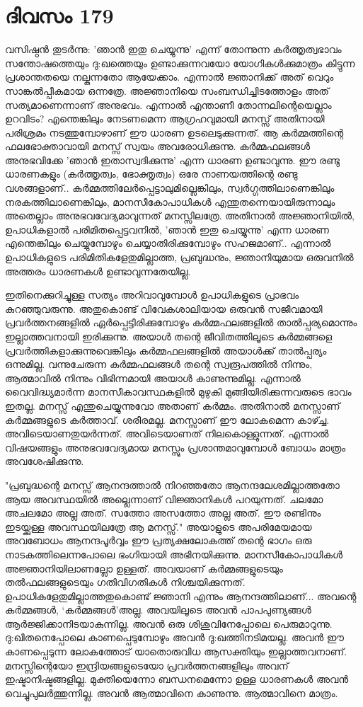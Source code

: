 \section{ദിവസം 179}


വസിഷ്ഠൻ തുടർന്നു: 'ഞാൻ ഇതു ചെയ്യുന്നു' എന്ന് തോന്നുന്ന കർത്തൃത്വഭാവം സന്തോഷത്തെയും ദു:ഖത്തെയും ഉണ്ടാക്കുന്നവയോ യോഗികൾക്കുമാത്രം കിട്ടുന്ന പ്രശാന്തതയെ നല്കുന്നതോ ആയേക്കാം. എന്നാൽ ജ്ഞാനിക്ക് അത് വെറും സാങ്കല്‍പ്പീകമായ ഒന്നത്രേ. അജ്ഞാനിയെ സംബന്ധിച്ചിടത്തോളം അത് സത്യമാണെന്നാണ്‌ അനുഭവം. എന്നാൽ എന്താണീ തോന്നലിന്റെയെല്ലാം ഉറവിടം? എന്തെങ്കിലും നേടണമെന്ന ആഗ്രഹവുമായി മനസ്സ് അതിനായി പരിശ്രമം നടത്തുമ്പോഴാണ്‌ ഈ ധാരണ ഉടലെടുക്കുന്നത്. ആ കർമ്മത്തിന്റെ ഫലഭോക്താവായി മനസ്സ് സ്വയം അവരോധിക്കുന്നു. കർമ്മഫലങ്ങൾ അനുഭവിക്കേ 'ഞാൻ ഇതാസ്വദിക്കുന്നു' എന്ന ധാരണ ഉണ്ടാവുന്നു. ഈ രണ്ടു ധാരണകളും (കർത്തൃത്വം, ഭോക്തൃത്വം) ഒരേ നാണയത്തിന്റെ രണ്ടു വശങ്ങളാണ്‌.. കർമ്മത്തിലേർപ്പെട്ടാലുമില്ലെങ്കിലും, സ്വർഗ്ഗത്തിലാണെങ്കിലും നരകത്തിലാണെങ്കിലും, മാനസീകോപാധികൾ എന്തുതന്നെയായിരുന്നാലും അതെല്ലാം അനുഭവവേദ്യമാവുന്നത് മനസ്സിലത്രേ. അതിനാൽ അജ്ഞാനിയിൽ, ഉപാധികളാൽ പരിമിതപ്പെട്ടവനിൽ, 'ഞാൻ ഇതു ചെയ്യുന്നു' എന്ന ധാരണ എന്തെങ്കിലും ചെയ്യുമ്പോഴും ചെയ്യാതിരിക്കുമ്പോഴും സഹജമാണ്‌.. എന്നാൽ ഉപാധികളുടെ പരിമിതികളേതുമില്ലാത്ത, പ്രബുദ്ധനും, ജ്ഞാനിയുമായ ഒരുവനിൽ അത്തരം ധാരണകൾ ഉണ്ടാവുന്നതേയില്ല.

ഇതിനെക്കുറിച്ചുള്ള സത്യം  അറിവാവുമ്പോൾ ഉപാധികളുടെ പ്രാഭവം കുറഞ്ഞുവരുന്നു. അതുകൊണ്ട് വിവേകശാലിയായ ഒരുവൻ സജീവമായി പ്രവർത്തനങ്ങളിൽ ഏർപ്പെട്ടിരിക്കുമ്പോഴും കർമ്മഫലങ്ങളിൽ താൽപ്പര്യമൊന്നും ഇല്ലാത്തവനായി ഇരിക്കുന്നു. അയാൾ തന്റെ ജീവിതത്തിലൂടെ കർമ്മങ്ങളെ പ്രവര്‍ത്തികളാക്കുന്നുവെങ്കിലും കർമ്മഫലങ്ങളിൽ അയാൾക്ക് താൽപ്പര്യം ഒന്നുമില്ല. വന്നുചേരുന്ന കർമ്മഫലങ്ങൾ തന്റെ സ്വരൂപത്തിൽ നിന്നും, ആത്മാവിൽ നിന്നും വിഭിന്നമായി അയാൾ കാണുന്നുമില്ല. എന്നാൽ വൈവിദ്ധ്യമാര്‍ന്ന മാനസീകാവസ്ഥകളിൽ മുഴുകി മുങ്ങിയിരിക്കുന്നവരുടെ ഭാവം ഇതല്ല. മനസ്സ് എന്തുചെയ്യുന്നുവോ അതാണ്‌ കർമ്മം. അതിനാൽ മനസ്സാണ്‌ കർമ്മങ്ങളുടെ കർത്താവ്. ശരീരമല്ല. മനസ്സാണ്‌ ഈ ലോകമെന്ന കാഴ്ച്ച. അവിടെയാണതുയർന്നത്. അവിടെയാണത് നിലകൊള്ളുന്നത്. എന്നാൽ വിഷയങ്ങളും അനുഭവവേദ്യമായ മനസ്സും പ്രശാന്തമാവുമ്പോൾ ബോധം മാത്രം അവശേഷിക്കുന്നു.

"പ്രബുദ്ധന്റെ മനസ്സ് ആനന്ദത്താൽ നിറഞ്ഞതോ ആനന്ദലേശമില്ലാത്തതോ ആയ അവസ്ഥയിൽ അല്ലെന്നാണ്‌ വിജ്ഞാനികൾ പറയുന്നത്. ചലമോ അചലമോ അല്ല അത്. സത്തോ  അസത്തോ അല്ല അത്. ഈ രണ്ടിനും ഇടയ്ക്കുള്ള അവസ്ഥയിലത്രേ ആ മനസ്സ്." അയാളുടെ അപരിമേയമായ അവബോധം ആനന്ദപൂർവ്വം ഈ പ്രത്യക്ഷലോകത്ത് തന്റെ ഭാഗം ഒരു നാടകത്തിലെന്നപോലെ ഭംഗിയായി അഭിനയിക്കുന്നു. മാനസീകോപാധികൾ അജ്ഞാനിയിലാണല്ലോ ഉള്ളത്. അവയാണ്‌ കർമ്മങ്ങളുടെയും തൽഫലങ്ങളുടെയും ഗതിവിഗതികൾ നിശ്ചയിക്കുന്നത്. ഉപാധികളേതുമില്ലാത്തതുകൊണ്ട് ജ്ഞാനി എന്നും ആനന്ദത്തിലാണ്‌... അവന്റെ കർമ്മങ്ങൾ, ‘കർമ്മങ്ങൾ’അല്ല. അവയിലൂടെ അവൻ പാപപുണ്യങ്ങൾ ആർജ്ജിക്കാനിടയാകുന്നില്ല. അവൻ ഒരു ശിശുവിനേപ്പോലെ പെരുമാറുന്നു. ദു:ഖിതനെപ്പോലെ കാണപ്പെടുമ്പോഴും അവൻ ദു:ഖത്തിനടിമയല്ല. അവൻ ഈ കാണപ്പെടുന്ന ലോകത്തോട് യാതൊരുവിധ ആസക്തിയും ഇല്ലാത്തവനാണ്‌. മനസ്സിന്റെയോ ഇന്ദ്രിയങ്ങളുടെയോ പ്രവർത്തനങ്ങളിലും അവന്‌ ഇഷ്ടാനിഷ്ടങ്ങളില്ല. മുക്തിയെന്നോ ബന്ധനമെന്നോ ഉള്ള ധാരണകൾ അവൻ വെച്ചുപുലർത്തുന്നില്ല. അവൻ ആത്മാവിനെ കാണുന്നു. ആത്മാവിനെ മാത്രം. 

